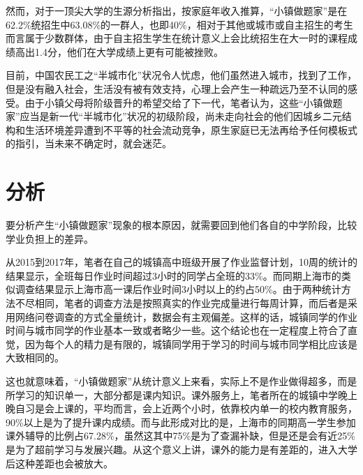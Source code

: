 \documentclass[10pt,a4paper,heading=false]{ctexart}
\begin{document}
    然而，对于一顶尖大学的生源分析指出，按家庭年收入推算，“小镇做题家”是在62.2\%统招生中63.08\%的一群人，也即40\%，相对于其他或城市或自主招生的考生而言属于少数群体，由于自主招生学生在统计意义上会比统招生在大一时的课程成绩高出1.4分\cite{pkurev}，他们在大学成绩上更有可能被挫败。

    目前，中国农民工之“半城市化”状况令人忧虑，他们虽然进入城市，找到了工作，但是没有融入社会，生活没有被有效支持，心理上会产生一种疏远乃至不认同的感受。\cite{paracivil}由于小镇父母将阶级晋升的希望交给了下一代，笔者认为，这些“小镇做题家”应当是新一代“半城市化”状况的初级阶段，尚未走向社会的他们因城乡二元结构和生活环境差异遭到不平等的社会流动竞争，原生家庭已无法再给予任何模板式的指引，当未来不确定时，就会迷茫。
    \section{分析}
    要分析产生“小镇做题家”现象的根本原因，就需要回到他们各自的中学阶段，比较学业负担上的差异。

    从2015到2017年，笔者在自己的城镇高中班级开展了作业监督计划，10周的统计的结果显示，全班每日作业时间超过3小时的同学占全班的33\%\cite{planstormoverview}。而同期上海市的类似调查结果显示上海市高一课后作业时间3小时以上的约占50\%\cite{shanghaihome}。由于两种统计方法不尽相同，笔者的调查方法是按照真实的作业完成量进行每周计算，而后者是采用网络问卷调查的方式全量统计，数据会有主观偏差。这样的话，城镇同学的作业时间与城市同学的作业基本一致或者略少一些。这个结论也在一定程度上符合了直觉，因为每个人的精力是有限的，城镇同学用于学习的时间与城市同学相比应该是大致相同的。
    
    这也就意味着，“小镇做题家”从统计意义上来看，实际上不是作业做得超多，而是所学习的知识单一，大部分都是课内知识。课外服务上，笔者所在的城镇中学晚上晚自习是会上课的，平均而言，会上近两个小时，依靠校内单一的校内教育服务，90\%以上是为了提升课内成绩。而与此形成对比的是，上海市的同期高一学生参加课外辅导的比例占67.28\%，虽然这其中75\%是为了查漏补缺，但是还是会有近25\%是为了超前学习与发展兴趣\cite{shanghaihome}。从这个意义上讲，课外的能力是有差距的，进入大学后这种差距也会被放大。
\end{document}
